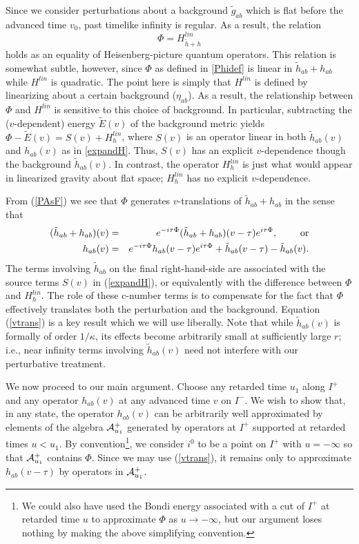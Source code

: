 \documentclass[12pt,onecolumn,eqsecnum,aps,prd,nofootinbib]{revtex4}
\def\be{\begin{equation}}
\def\bea{\begin{eqnarray}}
\def\ee{\end{equation}}
\def\eea{\end{eqnarray}}
\begin{document}
Since we consider perturbations about a background $\tilde g_{ab}$
which is flat before the advanced time $v_0$, past timelike infinity
is regular.  As a result, the relation
 \be
 \label{PAsF}
 \Phi = H^{lin}_{\tilde h + h}
 \ee
holds as an equality of Heisenberg-picture quantum operators.
This relation is somewhat subtle, however, since $\Phi$ as defined in
\eqref{Phidef} is linear in $\tilde h_{ab} + h_{ab}$ while $H^{lin}$ is quadratic.  The point here is simply that $H^{lin}$ is defined by linearizing about a certain background ($\eta_{ab}$).  As a result, the relationship between $\Phi$ and $H^{lin}$ is sensitive to this choice of background.  In particular, subtracting the ($v$-dependent) energy $\tilde E (v)$ of the background metric yields $\Phi - \tilde E(v)  = S(v)  + H^{lin}_h$, where $S(v)$ is an operator linear in both $\tilde h_{ab}(v)$ and $h_{ab}(v)$ as in \eqref{expandH}.  Thus, $S(v)$ has an explicit $v$-dependence though the background $\tilde h_{ab}(v)$.  In contrast, the operator $H^{lin}_h$ is just what would appear in linearized gravity about flat space; $H^{lin}_h$ has no explicit $v$-dependence.

From (\ref{PAsF}) we see that $\Phi$ generates $v$-translations of
$\tilde h_{ab} + h_{ab}$ in the sense that
  \bea
  \label{vtrans}
 (\tilde h_{ab} + h_{ab})(v) &=&  e^{-i \tau \Phi} (\tilde h_{ab}
 + h_{ab})(v- \tau) e^{i \tau \Phi}, \ \ \ \ \  \ \ {\rm or}
  \cr h_{ab}(v) &=&
e^{-i \tau \Phi} h_{ab}(v-\tau) e^{i \tau \Phi} + \tilde h_{ab}
(v-\tau) - \tilde h_{ab}(v).
  \eea
  The terms involving $\tilde h_{ab}$ on the final right-hand-side
are associated with the source terms $S(v)$ in (\ref{expandH}), or
equivalently with the difference between $\Phi$ and $H^{lin}_h$. The role of these c-number terms is to compensate for the fact that $\Phi$ effectively translates both the perturbation and the background.
Equation (\ref{vtrans}) is a key result which we will use liberally.
Note that while $\tilde h_{ab}(v)$ is formally of order $1/\kappa$,
its effects become arbitrarily small at sufficiently large $r$; i.e., near
infinity terms involving $\tilde h_{ab}(v)$ need not interfere with
our perturbative treatment.

We now proceed to our main argument.  Choose any retarded time $u_1$
along $I^+$ and any operator $h_{ab}(v)$ at any advanced time $v$ on
$I^-$.  We wish to show that, in any state, the operator $h_{ab}(v)$
can be arbitrarily well approximated by elements of the algebra
${\cal A}^+_{u_1}$ generated by operators at $I^+$ supported at
retarded times $u < u_1$.  By convention\footnote{We could also have
used the Bondi energy associated with a cut of $I^+$ at retarded time $u$
to approximate $\Phi$ as $u \rightarrow - \infty$, but our argument
loses nothing by making the above simplifying convention.}, we
consider $i^0$ to be a point on $I^+$ with $u = - \infty$ so that
${\cal A}^+_{u_1}$ contains $\Phi$.  Since we may use
(\ref{vtrans}), it remains only to approximate $h_{ab}(v-\tau)$ by
operators in ${\cal A}^+_{u_1}$.
\end{document}
